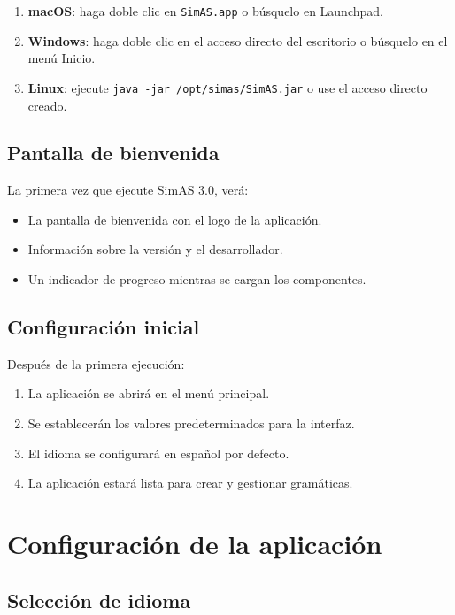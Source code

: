 \begin{enumerate}
    \item \textbf{macOS}: haga doble clic en \texttt{SimAS.app} o búsquelo en Launchpad.
    \item \textbf{Windows}: haga doble clic en el acceso directo del escritorio o búsquelo en el menú Inicio.
    \item \textbf{Linux}: ejecute \texttt{java -jar /opt/simas/SimAS.jar} o use el acceso directo creado.
\end{enumerate}

\subsection{Pantalla de bienvenida}

La primera vez que ejecute SimAS 3.0, verá:

\begin{itemize}
    \item La pantalla de bienvenida con el logo de la aplicación.
    \item Información sobre la versión y el desarrollador.
    \item Un indicador de progreso mientras se cargan los componentes.
\end{itemize}

\subsection{Configuración inicial}

Después de la primera ejecución:

\begin{enumerate}
    \item La aplicación se abrirá en el menú principal.
    \item Se establecerán los valores predeterminados para la interfaz.
    \item El idioma se configurará en español por defecto.
    \item La aplicación estará lista para crear y gestionar gramáticas.
\end{enumerate}

\section{Configuración de la aplicación}

\subsection{Selección de idioma}

